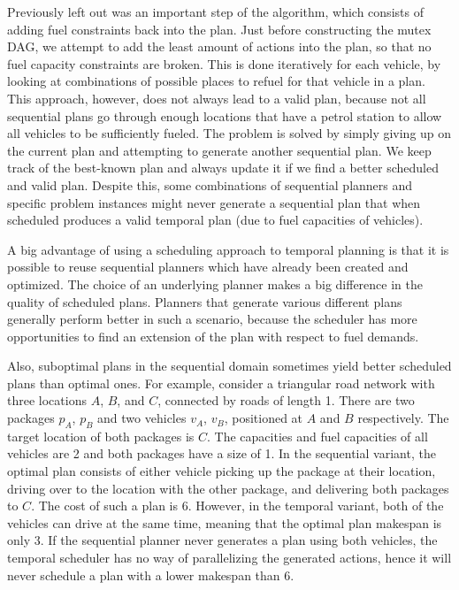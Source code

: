 Previously left out was an important step of the algorithm,
which consists of adding fuel constraints back into the plan.
Just before constructing the mutex DAG,
we attempt to add the least amount of  actions
into the plan, so that no fuel capacity constraints are broken.
This is done iteratively for each vehicle,
by looking at combinations of possible places to refuel for that vehicle in a plan.
This approach, however, does not always lead to a valid plan,
because not all
sequential plans go through enough locations that have a petrol station
to allow all vehicles to be sufficiently fueled.
The problem is solved by simply giving up on the current plan
and attempting to generate another sequential plan.
We keep track of the best-known plan and always update it
if we find a better scheduled and valid plan.
Despite this, some combinations of sequential planners
and specific problem instances might never generate a sequential plan
that when scheduled produces a valid temporal plan (due to fuel capacities of vehicles).

A big advantage of using a scheduling approach to temporal planning
is that it is possible to
reuse sequential planners which have already been created
and optimized.
The choice of an underlying planner makes a big difference
in the quality of scheduled plans. Planners
that generate various different plans generally perform better
in such a scenario, because the scheduler has more
opportunities to find an extension of the plan with respect to fuel demands.

Also, suboptimal plans in the sequential domain
sometimes yield better scheduled plans than optimal ones.
For example, consider a triangular road network with three locations $A$, $B$, and $C$, connected by roads of length 1.
There are two packages $p_A$, $p_B$ and two vehicles $v_A$, $v_B$,
positioned at $A$ and $B$ respectively. The target location of both
packages is $C$. The capacities and fuel capacities of all vehicles
are 2 and both packages have a size of 1.
In the sequential variant, the optimal plan consists of either
vehicle picking up the package at their location, driving
over to the location with the other package, and delivering both packages
to $C$. The cost of such a plan is $6$.
However, in the temporal variant, both of the vehicles can drive at the same time, meaning that the optimal plan makespan is only $3$.
If the sequential planner never generates a plan
using both vehicles, the temporal scheduler has no way of
parallelizing the generated actions, hence it will never
schedule a plan with a lower makespan than $6$.

